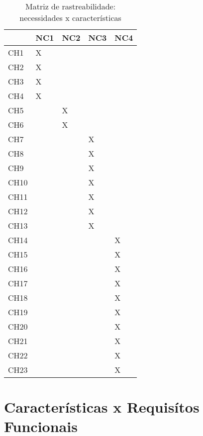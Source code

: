 \begin{table}[htb]
  \centering
  \caption{Matriz de rastreabilidade: necessidades x características}
  \label{nc-ch}
  \begin{tabular}{|l|l|l|l|l|}
    \hline
         & NC1 & NC2 & NC3 & NC4 \\ \hline
    CH1  &  X   &     &     &     \\ \hline
    CH2  &  X   &     &     &     \\ \hline
    CH3  &  X   &     &     &     \\ \hline
    CH4  &  X   &     &     &     \\ \hline
    CH5  &     &  X   &     &     \\ \hline
    CH6  &     &  X   &     &     \\ \hline
    CH7  &     &     &  X   &     \\ \hline
    CH8  &     &     &  X  &     \\ \hline
    CH9  &     &     &  X   &     \\ \hline
    CH10 &     &     &  X   &     \\ \hline
    CH11 &     &     &  X   &     \\ \hline
    CH12 &     &     &  X   &     \\ \hline
    CH13 &     &     &  X   &     \\ \hline
    CH14 &     &     &     &   X  \\ \hline
    CH15 &     &     &     &   X  \\ \hline
    CH16 &     &     &     &   X  \\ \hline
    CH17 &     &     &     &   X  \\ \hline
    CH18 &     &     &     &   X  \\ \hline
    CH19 &     &     &     &   X  \\ \hline
    CH20 &     &     &     &   X  \\ \hline
    CH21 &     &     &     &   X  \\ \hline
    CH22 &     &     &     &   X  \\ \hline
    CH23 &     &     &     &   X  \\ \hline
  \end{tabular}
\end{table}

\section{Características x Requisítos Funcionais}

